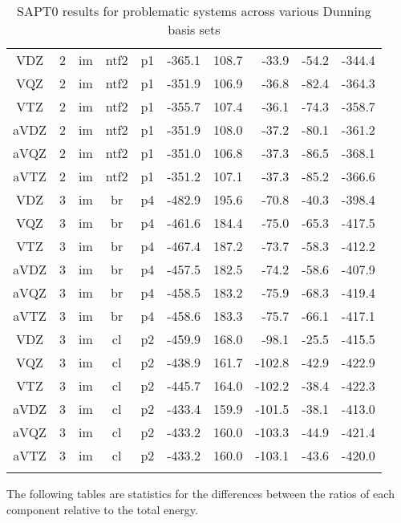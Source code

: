 \documentclass[a4paper]{article}
\begin{document}
\begin{table}[ht]
\begin{tabular}{cccccrrrrr}
  VDZ &  2 & im & ntf2 & p1 & -365.1 & 108.7 & -33.9 & -54.2 & -344.4 \\ 
  VQZ &  2 & im & ntf2 & p1 & -351.9 & 106.9 & -36.8 & -82.4 & -364.3 \\ 
  VTZ &  2 & im & ntf2 & p1 & -355.7 & 107.4 & -36.1 & -74.3 & -358.7 \\ 
  aVDZ &  2 & im & ntf2 & p1 & -351.9 & 108.0 & -37.2 & -80.1 & -361.2 \\ 
  aVQZ &  2 & im & ntf2 & p1 & -351.0 & 106.8 & -37.3 & -86.5 & -368.1 \\ 
  aVTZ &  2 & im & ntf2 & p1 & -351.2 & 107.1 & -37.3 & -85.2 & -366.6 \\ 
  VDZ &  3 & im & br & p4 & -482.9 & 195.6 & -70.8 & -40.3 & -398.4 \\ 
  VQZ &  3 & im & br & p4 & -461.6 & 184.4 & -75.0 & -65.3 & -417.5 \\ 
  VTZ &  3 & im & br & p4 & -467.4 & 187.2 & -73.7 & -58.3 & -412.2 \\ 
  aVDZ &  3 & im & br & p4 & -457.5 & 182.5 & -74.2 & -58.6 & -407.9 \\ 
  aVQZ &  3 & im & br & p4 & -458.5 & 183.2 & -75.9 & -68.3 & -419.4 \\ 
  aVTZ &  3 & im & br & p4 & -458.6 & 183.3 & -75.7 & -66.1 & -417.1 \\ 
  VDZ &  3 & im & cl & p2 & -459.9 & 168.0 & -98.1 & -25.5 & -415.5 \\ 
  VQZ &  3 & im & cl & p2 & -438.9 & 161.7 & -102.8 & -42.9 & -422.9 \\ 
  VTZ &  3 & im & cl & p2 & -445.7 & 164.0 & -102.2 & -38.4 & -422.3 \\ 
  aVDZ &  3 & im & cl & p2 & -433.4 & 159.9 & -101.5 & -38.1 & -413.0 \\ 
  aVQZ &  3 & im & cl & p2 & -433.2 & 160.0 & -103.3 & -44.9 & -421.4 \\ 
  aVTZ &  3 & im & cl & p2 & -433.2 & 160.0 & -103.1 & -43.6 & -420.0 \\ 
   \hline

\caption{SAPT0 results for problematic systems across various Dunning basis sets} \\ %
\end{tabular}
\end{table}


The following tables are statistics for the differences between the ratios of each component relative to the total energy. 
\end{document}
